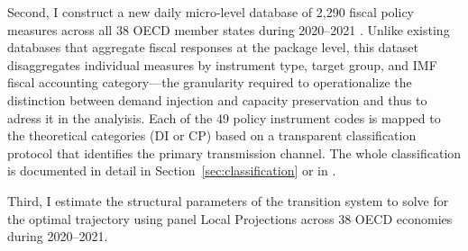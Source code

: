 \documentclass[12pt, a4paper]{article}
\begin{document}
Second, I construct a new daily micro-level database of 2,290 fiscal policy measures across
all 38 OECD member states during 2020--2021 \citep{pesenti2025}. Unlike existing
databases that aggregate fiscal responses at the package level, this dataset
disaggregates individual measures by instrument type, target group, and IMF fiscal
accounting category---the granularity required to operationalize the distinction
between demand injection and capacity preservation and thus to adress it in the analyisis. Each of the 49 policy instrument codes is mapped to the theoretical categories (DI or CP) based on a transparent classification protocol that identifies the primary transmission channel. The whole  classification is documented in detail in Section~\ref{sec:classification} or in \citep{Codebook}. 



Third, I estimate the structural parameters of the transition system to solve for the optimal trajectory using panel Local Projections \citep{jorda2025} across 38 OECD economies during 2020--2021. 

\end{document}
